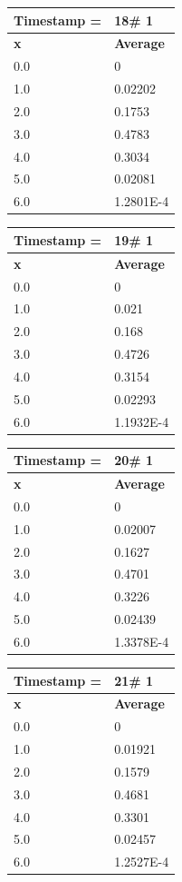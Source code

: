 \begin{tabular}{|l||l|}
\hline
\textbf{Timestamp =} & \textbf{18}\# 1\\\hline
	\textbf{x} & \textbf{Average} \\ \hline
\hline
	0.0 & 0 \\ \hline
	1.0 & 0.02202 \\ \hline
	2.0 & 0.1753 \\ \hline
	3.0 & 0.4783 \\ \hline
	4.0 & 0.3034 \\ \hline
	5.0 & 0.02081 \\ \hline
	6.0 & 1.2801E-4 \\ \hline
\end{tabular}
\begin{tabular}{|l||l|}
\hline
\textbf{Timestamp =} & \textbf{19}\# 1\\\hline
	\textbf{x} & \textbf{Average} \\ \hline
\hline
	0.0 & 0 \\ \hline
	1.0 & 0.021 \\ \hline
	2.0 & 0.168 \\ \hline
	3.0 & 0.4726 \\ \hline
	4.0 & 0.3154 \\ \hline
	5.0 & 0.02293 \\ \hline
	6.0 & 1.1932E-4 \\ \hline
\end{tabular}

\begin{tabular}{|l||l|}
\hline
\textbf{Timestamp =} & \textbf{20}\# 1\\\hline
	\textbf{x} & \textbf{Average} \\ \hline
\hline
	0.0 & 0 \\ \hline
	1.0 & 0.02007 \\ \hline
	2.0 & 0.1627 \\ \hline
	3.0 & 0.4701 \\ \hline
	4.0 & 0.3226 \\ \hline
	5.0 & 0.02439 \\ \hline
	6.0 & 1.3378E-4 \\ \hline
\end{tabular}
\begin{tabular}{|l||l|}
\hline
\textbf{Timestamp =} & \textbf{21}\# 1\\\hline
	\textbf{x} & \textbf{Average} \\ \hline
\hline
	0.0 & 0 \\ \hline
	1.0 & 0.01921 \\ \hline
	2.0 & 0.1579 \\ \hline
	3.0 & 0.4681 \\ \hline
	4.0 & 0.3301 \\ \hline
	5.0 & 0.02457 \\ \hline
	6.0 & 1.2527E-4 \\ \hline
\end{tabular}

